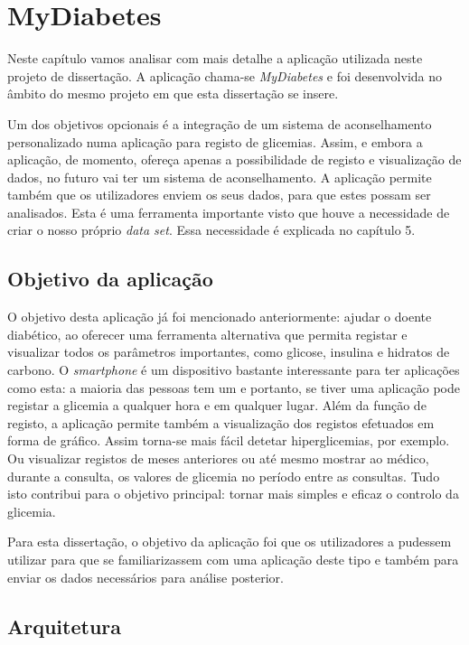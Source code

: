 \chapter{MyDiabetes}\label{chap:syst}

Neste capítulo vamos analisar com mais detalhe a aplicação utilizada neste projeto de dissertação. A aplicação chama-se \textit{MyDiabetes} e foi desenvolvida no âmbito do mesmo projeto em que esta dissertação se insere. 

Um dos objetivos opcionais é a integração de um sistema de aconselhamento personalizado numa aplicação para registo de glicemias. Assim, e embora a aplicação, de momento, ofereça apenas a possibilidade de registo e visualização de dados, no futuro vai ter um sistema de aconselhamento. A aplicação permite também que os utilizadores enviem os seus dados, para que estes possam ser analisados. Esta é uma ferramenta importante visto que houve a necessidade de criar o nosso próprio \textit{data set}. Essa necessidade é explicada no capítulo 5.


\section{Objetivo da aplicação}

O objetivo desta aplicação já foi mencionado anteriormente: ajudar o doente diabético, ao oferecer uma ferramenta alternativa que permita registar e visualizar todos os parâmetros importantes, como glicose, insulina e hidratos de carbono. O \textit{smartphone} é um dispositivo bastante interessante para ter aplicações como esta: a maioria das pessoas tem um e portanto, se tiver uma aplicação pode registar a glicemia a qualquer hora e em qualquer lugar.
Além da função de registo, a aplicação permite também a visualização dos registos efetuados em forma de gráfico. Assim torna-se mais fácil detetar hiperglicemias, por exemplo. Ou visualizar registos de meses anteriores ou até mesmo mostrar ao médico, durante a consulta, os valores de glicemia no período entre as consultas.
Tudo isto contribui para o objetivo principal: tornar mais simples e eficaz o controlo da glicemia. 

Para esta dissertação, o objetivo da aplicação foi que os utilizadores a pudessem utilizar para que se familiarizassem com uma aplicação deste tipo e também para enviar os dados necessários para análise posterior.

\section{Arquitetura}

